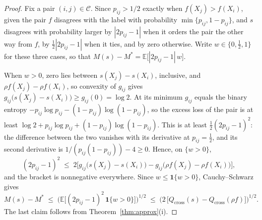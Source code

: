 \documentclass[11pt]{article}
\theoremstyle{remark}
\newcommand{\E}{\mathbb{E}}
\newcommand{\Qc}{Q_{\mathrm{cross}}}
\newcommand{\Cc}{\mathcal{C}}
\begin{document}
\begin{proof}
Fix a pair $(i,j)\in\Cc$. Since $p_{ij} > 1/2$ exactly when $f(X_j) > f(X_i)$, given the pair $f$
disagrees with the label with probability $\min\{p_{ij},1-p_{ij}\}$, and $s$ disagrees with probability
larger by $|2p_{ij}-1|$ when it orders the pair the other way from $f$, by $\tfrac12|2p_{ij}-1|$ when it
ties, and by zero otherwise. Write $w \in \{0,\tfrac12,1\}$ for these three cases, so that
$M(s) - M^{*} = \E\big[|2p_{ij}-1|\,w\big]$.

When $w>0$, zero lies between $s(X_j)-s(X_i)$, inclusive, and $\rho f(X_j)-\rho f(X_i)$, so convexity of
$g_{ij}$ gives $g_{ij}\big(s(X_j)-s(X_i)\big) \ge g_{ij}(0) = \log 2$. At its minimum $g_{ij}$ equals the
binary entropy $-p_{ij}\log p_{ij}-(1-p_{ij})\log(1-p_{ij})$, so the excess loss of the pair is at least
$\log 2 + p_{ij}\log p_{ij} + (1-p_{ij})\log(1-p_{ij})$. This is at least $\tfrac12(2p_{ij}-1)^{2}$: the
difference between the two vanishes with its derivative at $p_{ij}=\tfrac12$, and its second derivative
is $1/(p_{ij}(1-p_{ij})) - 4 \ge 0$. Hence, on $\{w>0\}$,
\[
    (2p_{ij}-1)^{2} \;\le\; 2\Big[g_{ij}\big(s(X_j)-s(X_i)\big) - g_{ij}\big(\rho f(X_j)-\rho f(X_i)\big)\Big],
\]
and the bracket is nonnegative everywhere. Since $w \le \mathbf{1}\{w>0\}$, Cauchy--Schwarz gives
\[
    M(s) - M^{*} \;\le\; \Big(\E\big[(2p_{ij}-1)^{2}\,\mathbf{1}\{w>0\}\big]\Big)^{1/2}
    \;\le\; \Big(2\,\big[\Qc(s)-\Qc(\rho f)\big]\Big)^{1/2}.
\]
The last claim follows from Theorem~\ref{thm:approx}(i).
\end{proof}
\end{document}
